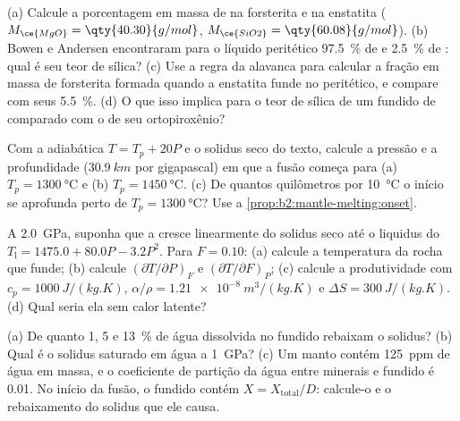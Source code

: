 \begin{exercise}[$\star\star$]\label{exo:b2:mantle-melting:6}
(a) Calcule a porcentagem em massa de  na forsterita  e na
enstatita  ($M_{\ce{MgO}} = \qty{40.30}{g/mol}$, $M_{\ce{SiO2}} =
\qty{60.08}{g/mol}$). (b) Bowen e Andersen encontraram para o líquido peritético
\qty{97.5}{\percent} de  e \qty{2.5}{\percent} de : qual é seu
teor de sílica? (c) Use a regra da alavanca para calcular a fração em massa de forsterita
formada quando a enstatita funde no peritético, e compare com seus
\qty{5.5}{\percent}. (d) O que isso implica para o teor de sílica de um fundido de
 comparado com o de seu ortopiroxênio?
\end{exercise}

\begin{exercise}[$\star\star$]\label{exo:b2:mantle-melting:7}
Com a adiabática $T = T_p + 20P$ e o solidus seco do texto, calcule a
pressão e a profundidade ($\qty{30.9}{km}$ por gigapascal) em que a fusão começa
para (a) $T_p = \qty{1300}{\celsius}$ e (b) $T_p = \qty{1450}{\celsius}$. (c) De
quantos quilômetros por \qty{10}{\celsius} o início se aprofunda perto de
$T_p = \qty{1300}{\celsius}$? Use a \cref{prop:b2:mantle-melting:onset}.
\end{exercise}

\begin{exercise}[$\star\star$]\label{exo:b2:mantle-melting:8}
A \qty{2.0}{GPa}, suponha que a  cresce linearmente do solidus seco até
o liquidus do  $T_{\mathrm l} = 1475.0 + 80.0P - 3.2P^2$. Para $F = 0.10$:
(a) calcule a temperatura da rocha que funde; (b) calcule $(\partial
T/\partial P)_F$ e $(\partial T/\partial F)_P$; (c) calcule a produtividade com
$c_p = \qty{1000}{J/(kg.K)}$, $\alpha/\rho = \qty{1.21e-8}{m^3/(kg.K)}$ e
$\Delta S = \qty{300}{J/(kg.K)}$. (d) Qual seria ela sem calor latente?
\end{exercise}

\begin{exercise}[$\star\star$]\label{exo:b2:mantle-melting:9}
(a) De quanto 1, 5 e \qty{13}{\percent} de água dissolvida no fundido rebaixam
o solidus? (b) Qual é o solidus saturado em água a \qty{1}{GPa}? (c) Um manto
contém \qty{125}{ppm} de água em massa, e o coeficiente de partição da água entre
minerais e fundido é 0.01. No início da fusão, o fundido contém $X =
X_{\text{total}}/D$: calcule-o e o rebaixamento do solidus que ele causa.
\end{exercise}

